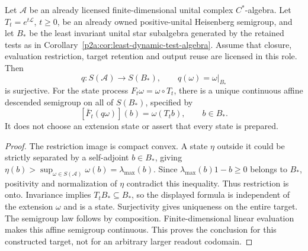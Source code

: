 \documentclass[12pt,a4paper]{article}
\begin{document}
\begin{proposition}
\label{p2a:prop:v257-observable-process-target}
Let $\mathcal A$ be an already licensed finite-dimensional unital complex
$C^*$-algebra. Let $T_t=e^{t\mathcal L}$, $t\ge0$, be an already owned
positive-unital Heisenberg semigroup, and let $B_*$ be the least invariant
unital star subalgebra generated by the retained tests as in
Corollary~\ref{p2a:cor:least-dynamic-test-algebra}.
Assume that closure, evaluation restriction, target retention and output
reuse are licensed in this role. Then
\[
 q:S(\mathcal A)\longrightarrow S(B_*),\qquad
 q(\omega)=\omega|_{B_*}
\]
is surjective. For the state process $F_t\omega=\omega\circ T_t$,
there is a unique continuous affine descended semigroup on all of $S(B_*)$,
specified by
\[
 [\bar F_t(q\omega)](b)=\omega(T_tb),\qquad b\in B_*.
\]
It does not choose an extension state or assert that every state is prepared.
\end{proposition}
\begin{proof}
The restriction image is compact convex. A state $\eta$ outside it could
be strictly separated by a self-adjoint $b\in B_*$, giving
$\eta(b)>\sup_{\omega\in S(\mathcal A)}\omega(b)=\lambda_{\max}(b)$.
Since $\lambda_{\max}(b)1-b\ge0$ belongs to $B_*$, positivity and
normalization of $\eta$ contradict this inequality. Thus restriction is
onto. Invariance implies $T_tB_*\subseteq B_*$, so the displayed formula
is independent of the extension $\omega$ and is a state. Surjectivity
gives uniqueness on the entire target. The semigroup law follows by
composition. Finite-dimensional linear evaluation makes this affine
semigroup continuous. This proves the conclusion for this constructed target,
not for an arbitrary larger readout codomain.
\end{proof}
\end{document}
